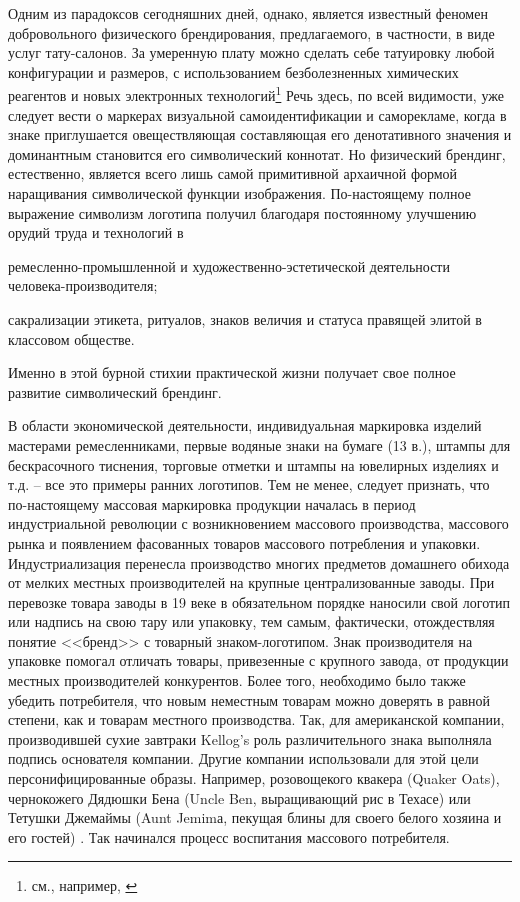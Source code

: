 Одним из парадоксов сегодняшних дней, однако, является известный феномен
добровольного физического брендирования, предлагаемого, в частности, в виде
услуг тату-салонов. За умеренную плату можно сделать себе татуировку любой
конфигурации и размеров, с использованием безболезненных химических реагентов
и новых электронных технологий\footnote{см., например, \autocites{digitaltattoo}{tedtattoo}}
Речь здесь, по всей видимости, уже следует вести о маркерах визуальной
самоидентификации и саморекламе, когда в знаке приглушается овеществляющая
составляющая его денотативного значения и доминантным становится его символический
коннотат. Но физический брендинг, естественно, является всего лишь самой примитивной
архаичной формой наращивания символической функции изображения. По-настоящему
полное выражение символизм логотипа получил благодаря постоянному улучшению
орудий труда и технологий в
\begin{enumerate*}[label=\asbuk*)]
    \item ремесленно-промышленной и художественно-эстетической деятельности человека-производителя;
    \item сакрализации этикета, ритуалов, знаков величия и статуса правящей элитой в
    классовом обществе.
\end{enumerate*}
Именно в этой бурной стихии практической жизни получает свое полное
развитие символический брендинг.

В области экономической деятельности, индивидуальная маркировка изделий мастерами
ремесленниками, первые водяные знаки на бумаге (13 в.), штампы для бескрасочного
тиснения, торговые отметки и штампы на ювелирных изделиях и т.д. -- все это примеры
ранних логотипов. Тем не менее, следует признать, что по-настоящему массовая маркировка
продукции началась в период индустриальной революции с возникновением массового производства,
массового рынка и появлением фасованных товаров массового потребления и упаковки.
Индустриализация перенесла производство многих предметов домашнего обихода от
мелких местных производителей на крупные централизованные заводы. При перевозке
товара заводы в 19 веке в обязательном порядке наносили свой логотип или надпись на
свою тару или упаковку, тем самым, фактически,  отождествляя понятие <<бренд>>
с  товарный знаком-логотипом.  Знак производителя на упаковке помогал отличать
товары, привезенные с крупного завода, от продукции местных производителей конкурентов.
Более того, необходимо было также убедить потребителя, что новым неместным товарам
можно доверять в равной степени, как  и товарам местного производства. Так, для
американской компании, производившей сухие завтраки Kellog’s  роль различительного
знака выполняла подпись основателя компании\autocite[][8]{evami2009}. Другие компании использовали
для этой цели персонифицированные образы. Например, розовощекого квакера (Quaker Oats),
чернокожего Дядюшки Бена (Uncle Ben, выращивающий рис в Техасе) или
Тетушки Джемаймы (Aunt Jemimа, пекущая блины для своего белого хозяина и его гостей) \autocite[][8]{evami2009}.
Так начинался процесс воспитания массового потребителя.

